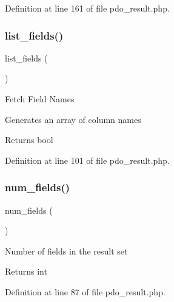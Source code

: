 Definition at line 161 of file pdo\+\_\+result.\+php.

\mbox{\label{class_c_i___d_b__pdo__result_a50b54eb4ea7cfd039740f532988ea776}} 
\subsubsection{\texorpdfstring{list\_fields()}{list\_fields()}}
{\footnotesize\ttfamily list\+\_\+fields (\begin{DoxyParamCaption}{ }\end{DoxyParamCaption})}

Fetch Field Names

Generates an array of column names

\begin{DoxyReturn}{Returns}
bool 
\end{DoxyReturn}


Definition at line 101 of file pdo\+\_\+result.\+php.

\mbox{\label{class_c_i___d_b__pdo__result_af831bf363e4d7d661a717a4932af449d}} 
\subsubsection{\texorpdfstring{num\_fields()}{num\_fields()}}
{\footnotesize\ttfamily num\+\_\+fields (\begin{DoxyParamCaption}{ }\end{DoxyParamCaption})}

Number of fields in the result set

\begin{DoxyReturn}{Returns}
int 
\end{DoxyReturn}


Definition at line 87 of file pdo\+\_\+result.\+php.

\mbox{\label{class_c_i___d_b__pdo__result_a218657c303ee499b97710ab0cd2f5d6e}} 
